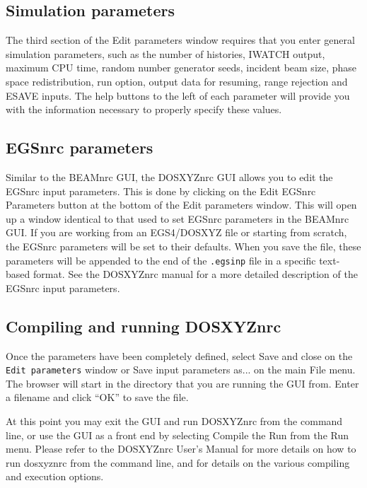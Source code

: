 \documentclass[12pt,twoside]{article}
\begin{document}
\subsection{Simulation parameters}

The third section of the {\sf Edit parameters} window requires that you
enter general simulation parameters, such as the number of histories,
IWATCH output, maximum CPU time, random number generator seeds,
incident beam size, phase space
redistribution, run option, output data for resuming, range rejection and ESAVE
inputs.  The help buttons to the left of each parameter will
provide you with the information necessary to properly specify these
values.

\subsection{EGSnrc parameters}

Similar to the BEAMnrc GUI, the DOSXYZnrc GUI allows you to edit the
EGSnrc input parameters.  This is done by clicking on the
{\sf Edit EGSnrc Parameters} button at the bottom of the
{\sf Edit parameters} window.  This will open up a window identical
to that used to set EGSnrc parameters in the BEAMnrc GUI.
If you are working
from an EGS4/DOSXYZ file or starting from scratch, the EGSnrc parameters
will be set to their defaults.  When you save the file,
these parameters will be appended to the end of the {\tt .egsinp} file
in a specific text-based format.  See the DOSXYZnrc manual for a more
detailed description of the EGSnrc input parameters.

\subsection{Compiling and running DOSXYZnrc}

Once the parameters have been completely defined, select
{\sf Save and close} on the {\tt Edit parameters} window or
{\sf Save input parameters as...} on
the main {\sf File} menu.  The browser will start in the
directory that you are running the GUI from.  Enter a filename and click
``OK'' to save the file.

At this point you may exit the GUI and run DOSXYZnrc from the command line,
or use the
GUI as a front end by selecting {\sf Compile} the {\sf Run} from the
{\sf Run} menu.  Please
refer to the DOSXYZnrc User's Manual\cite{WR04a} for more details on how to run dosxyznrc
from the command line, and for details on the various compiling and
execution options.
\end{document}
